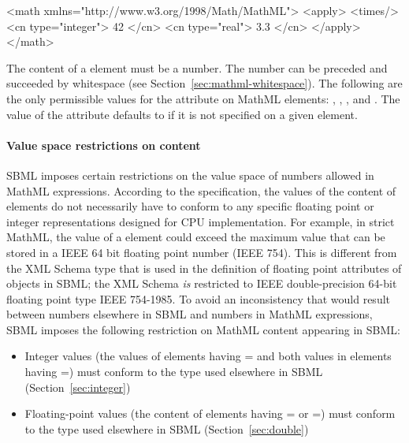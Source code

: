 \clearpage

\begin{example}
<math xmlns="http://www.w3.org/1998/Math/MathML">
    <apply>
        <times/> <cn type="integer"> 42 </cn> <cn type="real"> 3.3 </cn>
    </apply>
</math>
\end{example}

The content of a  element must be a number.  The number
can be preceded and succeeded by whitespace (see
Section~\ref{sec:mathml-whitespace}).  The following are the only
permissible values for the  attribute on MathML
 elements: , , ,
and .  The value of the  attribute
defaults to  if it is not specified on a given
 element.


\paragraph{Value space restrictions on  content}

SBML imposes certain restrictions on the value space of numbers
allowed in MathML expressions.  According to the \mathmltwo
specification, the values of the content of  elements do
not necessarily have to conform to any specific floating point or
integer representations designed for CPU implementation.  For
example, in strict MathML, the value of a  element could
exceed the maximum value that can be stored in a IEEE 64 bit
floating point number (IEEE 754).  This is different from the XML
Schema type  that is used in the definition of
floating point attributes of objects in SBML; the XML Schema
 \emph{is} restricted to IEEE double-precision
64-bit floating point type IEEE 754-1985.  To avoid an
inconsistency that would result between numbers elsewhere in SBML
and numbers in MathML expressions, SBML \thisLV imposes the
following restriction on MathML content appearing in SBML:
\begin{itemize}
  
\item Integer values (\ie the values of  elements
  having = and both values in  elements
  having =) must conform to the
   type used elsewhere in SBML
  (Section~\ref{sec:integer})
  
\item Floating-point values (\ie the content of 
  elements having = or
  =) must conform to the
   type used elsewhere in SBML
  (Section~\ref{sec:double})
\end{itemize}


